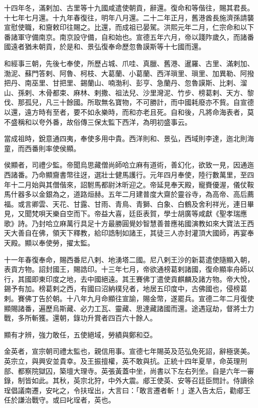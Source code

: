 \begin{pinyinscope}
十四年冬，滿剌加、古里等十九國咸遣使朝貢，辭還。復命和等偕往，賜其君長。十七年七月還。十九年春復往，明年八月還。二十二年正月，舊港酋長施濟孫請襲宣慰使職，和齎敕印往賜之。比還，而成祖已晏駕。洪熙元年二月，仁宗命和以下番諸軍守備南京。南京設守備，自和始也。宣德五年六月，帝以踐阼歲久，而諸番國遠者猶未朝貢，於是和、景弘復奉命歷忽魯謨斯等十七國而還。

和經事三朝，先後七奉使，所歷占城、爪哇、真臘、舊港、暹羅、古里、滿剌加、渤泥、蘇門答剌、阿魯、柯枝、大葛蘭、小葛蘭、西洋瑣里、瑣里、加異勒、阿撥把丹、南巫里、甘把里、錫蘭山、喃渤利、彭亨、急蘭丹、忽魯謨斯、比剌、溜山、孫剌、木骨都束、麻林、剌撒、祖法兒、沙里灣泥、竹步、榜葛剌、天方、黎伐、那孤兒，凡三十餘國。所取無名寶物，不可勝計，而中國耗廢亦不貲。自宣德以還，遠方時有至者，要不如永樂時，而和亦老且死。自和後，凡將命海表者，莫不盛稱和以夸外番，故俗傳三保太監下西洋，為明初盛事云。

當成祖時，銳意通四夷，奉使多用中貴。西洋則和、景弘，西域則李達，迤北則海童，而西番則率使侯顯。

侯顯者，司禮少監。帝聞烏思藏僧尚師哈立麻有道術，善幻化，欲致一見，因通迤西諸番。乃命顯齎書幣往迓，選壯士健馬護行。元年四月奉使，陸行數萬里，至四年十二月始與其僧偕來，詔駙馬都尉沐昕迎之。帝延見奉天殿，寵賚優渥，儀仗鞍馬什器多以金銀為之，道路烜赫。五年二月建普度大齋於靈谷寺，為高帝、高后薦福。或言卿雲、天花、甘露、甘雨、青鳥、青獅、白象、白鶴及舍利祥光，連日畢見，又聞梵唄天樂自空而下。帝益大喜，廷臣表賀，學士胡廣等咸獻《聖孝瑞應歌》詩。乃封哈立麻萬行具足十方最勝圓覺妙智慧善普應祐國演教如來大寶法王西天大善自在佛，領天下釋教，給印誥制如諸王，其徒三人亦封灌頂大國師，再宴奉天殿。顯以奉使勞，擢太監。

十一年春復奉命，賜西番尼八剌、地湧塔二國。尼八剌王沙的新葛遣使隨顯入朝，表貢方物。詔封國王，賜誥印。十三年七月，帝欲通榜葛剌諸國，復命顯率舟師以行，其國即東印度之地，去中國絕遠。其王賽佛丁遣使貢麒麟及諸方物。帝大悅，錫予有加。榜葛剌之西，有國曰沼納樸兒者，地居五印度中，古佛國也，侵榜葛剌。賽佛丁告於朝。十八年九月命顯往宣諭，賜金幣，遂罷兵。宣德二年二月復使顯賜諸番，遍歷烏斯藏、必力工瓦、靈藏、思達藏諸國而還。途遇寇劫，督將士力戰，多所斬獲。還朝，錄功升賞者四百六十餘人。

顯有才辨，強力敢任，五使絕域，勞績與鄭和亞。

金英者，宣宗朝司禮太監也，親信用事。宣德七年賜英及范弘免死詔，辭極褒美。英宗立，與興安並貴幸。及王振擅權，英不敢與抗。正統十四年夏旱，命英理刑部、都察院獄囚，築壇大理寺。英張黃蓋中坐，尚書以下左右列坐。自是六年一審錄，制皆如此。其秋，英宗北狩，中外大震。郕王使英、安等召廷臣問計。侍讀徐珵倡議南遷，安叱之，令扶珵出，大言曰：「敢言遷者斬！」遂入告太后，勸郕王任於謙治戰守。或曰叱珵者，英也。


\end{pinyinscope}
